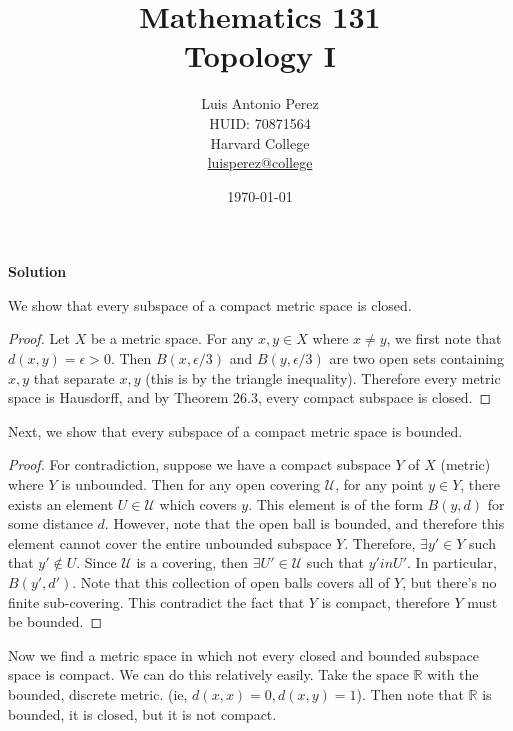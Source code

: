\documentclass[12pt]{article}
\title{Mathematics 131 \\
Topology I}
\author{
        Luis Antonio Perez \\
        HUID: 70871564 \\
        Harvard College \\
        \href{mailto:luisperez@college.harvard.edu}{luisperez@college}
}
\date{\today}
\newcounter{AnswerCounter}
\newcounter{SubAnswerCounter}
\newenvironment{answer}[0]{
  \setcounter{SubAnswerCounter}{1}
  \bigskip
  \textbf{Solution \arabic{AnswerCounter}}
  \\
  \begin{small}
}{
  \end{small}
  \stepcounter{AnswerCounter}
}
\begin{document}
\pagebreak
\begin{answer}[Page 171, \#4]
We show that every subspace of a compact metric space is closed.
\begin{proof}
Let $X$ be a metric space. For any $x,y \in X$ where $x \neq y$, we first note that $d(x,y) = \epsilon > 0$. Then $B(x,\epsilon/3)$ and $B(y,\epsilon/3)$ are two open sets containing $x,y$ that separate $x,y$ (this is by the triangle inequality). Therefore every metric space is Hausdorff, and by Theorem 26.3, every compact subspace is closed.
\end{proof}
Next, we show that every subspace of a compact metric space is bounded.
\begin{proof}
For contradiction, suppose we have a compact subspace $Y$ of $X$ (metric) where $Y$ is unbounded. Then for any open covering $\mathcal{U}$, for any point $y \in Y$, there exists an element $U \in \mathcal{U}$ which covers $y$. This element is of the form $B(y,d)$ for some distance $d$. However, note that the open ball is bounded, and therefore this element cannot cover the entire unbounded subspace $Y$. Therefore, $\exists y' \in Y$ such that $y' \notin U$. Since $\mathcal{U}$ is a covering, then $\exists U' \in \mathcal{U}$ such that $y' in U'$. In particular, $B(y',d')$. Note that this collection of open balls covers all of $Y$, but there's no finite sub-covering. This contradict the fact that $Y$ is compact, therefore $Y$ must be bounded.
\end{proof}
Now we find a metric space in which not every closed and bounded subspace space is compact. We can do this relatively easily. Take the space $\mathbb{R}$ with the bounded, discrete metric. (ie, $d(x,x) = 0, d(x,y) = 1$). Then note that $\mathbb{R}$ is bounded, it is closed, but it is not compact.
\end{answer}
\end{document}
